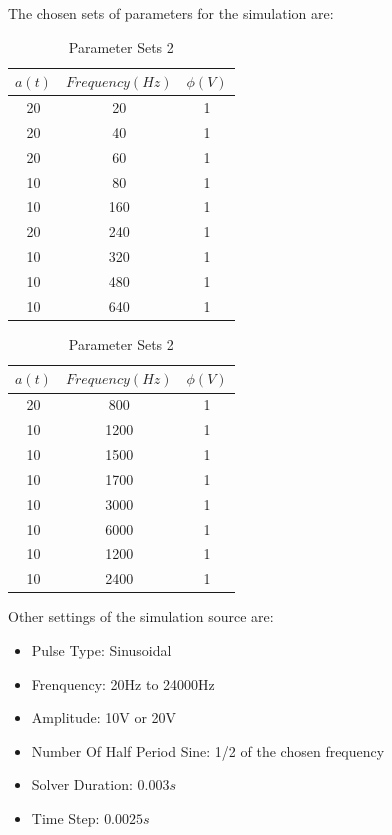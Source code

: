 \documentclass[letterpaper,12pt]{article}
\begin{document}
\noindent The chosen sets of parameters for the simulation are:
\begin{table}[H]
    \centering
    \scriptsize
    \begin{minipage}[t]{0.45\textwidth}
    \centering
    \begin{tabular}{|c|c|c|}
    \toprule
    \textbf{$a(t)$} & \textbf{$Frequency (Hz)$} & \textbf{$\phi (V)$} \\
    \midrule
    20 & 20   & 1 \\
    20 & 40   & 1 \\
    20 & 60   & 1 \\
    10 & 80   & 1 \\
    10 & 160  & 1 \\
    20 & 240  & 1 \\
    10 & 320  & 1 \\
    10 & 480  & 1 \\
    10 & 640  & 1 \\
    \bottomrule
    \end{tabular}
    \caption{Parameter Sets 1}
    \end{minipage}\hfill
    \begin{minipage}[t]{0.45\textwidth}
    \centering
    \begin{tabular}{|c|c|c|}
    \toprule
    \textbf{$a(t)$} & \textbf{$Frequency (Hz)$} & \textbf{$\phi (V)$} \\
    \midrule
    20 & 800  & 1 \\
    10 & 1200 & 1 \\
    10 & 1500 & 1 \\
    10 & 1700 & 1 \\
    10 & 3000 & 1 \\
    10 & 6000 & 1 \\
    10 & 1200 & 1 \\
    10 & 2400 & 1 \\
    \bottomrule
    \end{tabular}
    \caption{Parameter Sets 2}
    \end{minipage}
\end{table}
\noindent Other settings of the simulation source are:
\begin{multicols}{2}
\begin{itemize}
    \item Pulse Type: Sinusoidal
    \item Frenquency: 20Hz to 24000Hz
    \item Amplitude: 10V or 20V
    \item Number Of Half Period Sine: 1/2 of the chosen frequency
    \item Solver Duration: $0.003s$
    \item Time Step: $0.0025s$
\end{itemize}
\end{multicols}
\end{document}
